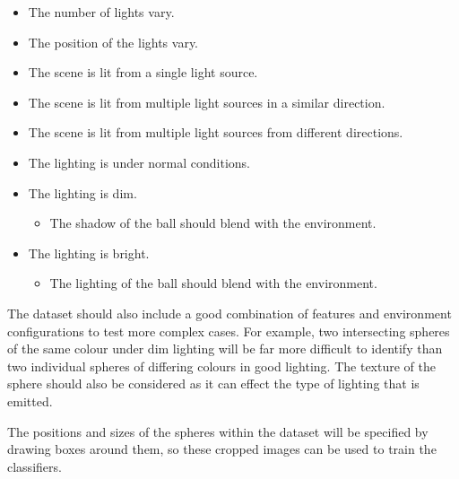 \documentclass[11pt]{scrartcl}
\begin{document}
{{        	\begin{itemize}
        		\item The number of lights vary.
        		\item The position of the lights vary.
        		\item The scene is lit from a single light source.
        		\item The scene is lit from multiple light sources in a similar direction.
        		\item The scene is lit from multiple light sources from different directions.
        		\item The lighting is under normal conditions.
        		\item The lighting is dim.
        		\begin{itemize}
        			\item The shadow of the ball should blend with the environment.
        		\end{itemize}
        		\item The lighting is bright.
        		\begin{itemize}
        			\item The lighting of the ball should blend with the environment.
        		\end{itemize}
        	\end{itemize}

        	The dataset should also include a good combination of features and
        	environment configurations to test more complex cases. For example, two
        	intersecting spheres of the same colour under dim lighting will be far 
        	more difficult to identify than two individual spheres of differing
        	colours in good lighting. The texture of the sphere should also be
        	considered as it can effect the type of lighting that is emitted.

        	The positions and sizes of the spheres within the dataset will be
        	specified by drawing boxes around them, so these cropped images can be
        	used to train the classifiers.

        }

	}
\end{document}

